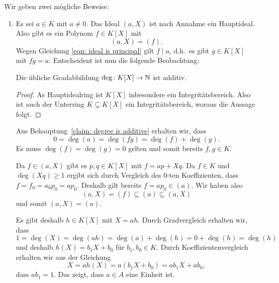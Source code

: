 \begin{solution}
  Wir geben zwei mögliche Beweise:  
  \begin{enumerate}
    \item
      Es sei $a \in K$ mit $a \neq 0$.
      Das Ideal $(a, X)$ ist nach Annahme ein Hauptideal.
      Also gibt es ein Polynom $f \in K[X]$ mit
      \begin{equation}
        \label{eqn: ideal is principal}
        (a, X) = (f).
      \end{equation}
      Wegen Gleichung \eqref{eqn: ideal is principal} gilt $f \mid a$, d.h.\ es gibt $g \in K[X]$ mit $fg = a$.
      Entscheident ist nun die folgende Beobachtung:
      
      \begin{claim}
        \label{claim: degree is additive}
        Die übliche Gradabbildung $\deg \colon K[X] \to \mathbb{N}$ ist additiv.
      \end{claim}
      \begin{proof}
        As Hauptidealring ist $K[X]$ inbesondere ein Integritätsbereich.
        Also ist auch der Unterring $K \subseteq K[X]$ ein Integritätsbereich, woraus die Aussage folgt.
      \end{proof}
      Aus Behauptung~\ref{claim: degree is additive} erhalten wir, dass
      \[
          0
        = \deg(a)
        = \deg(fg)
        = \deg(f) + \deg(g).
      \]
      Es muss $\deg(f) = \deg(g) = 0$ gelten und somit bereits $f, g \in K$.
      
      Da $f \in (a, X)$ gibt es $p, q \in K[X]$ mit $f = a p + X q$.
      Da $f \in K$ und $\deg(X q) \geq 1$ ergibt sich durch Vergleich des $0$-ten Koeffizienten, dass $f = f_0 = a_0 p_0 = a p_0$.
      Deshalb gilt bereits $f = a p_0 \in (a)$.
      Wir haben also
      \[
                  (a, X)
        =         (f)
        \subseteq (a)
        \subseteq (a, X)
      \]
      und somit $(a, X) = (a)$.
      
      Es gibt deshalb $h \in K[X]$ mit $X = a h$.
      Durch Gradvergleich erhalten wir, dass
      \[
          1
        = \deg(X)
        = \deg(a h)
        = \deg(a) + \deg(h)
        = 0 + \deg(h)
        = \deg(h)
      \]
      und deshalb $h(X) = b_1 X + b_0$ für $b_1, b_0 \in K$.
      Durch Koeffizientenvergleich erhalten wir aus der Gleichung
      \[
          X
        = a h(X)
        = a (b_1 X + b_0)
        = a b_1 X + a b_0,
      \]
      dass $a b_1 = 1$.
      Das zeigt, dass $a \in A$ eine Einheit ist.
      

\end{enumerate}
\end{solution}
